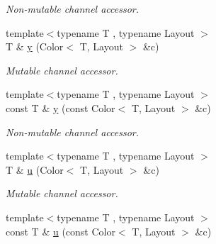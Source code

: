 \begin{DoxyCompactItemize}
\begin{DoxyCompactList}\small\item\em Non-\/mutable channel accessor. \end{DoxyCompactList}\item 
\hypertarget{group___channel_accessors_gac90c52c5b3a7b2a7e3761e6e84f25778}{{\footnotesize template$<$typename T , typename Layout $>$ }\\T \& \hyperlink{group___channel_accessors_gac90c52c5b3a7b2a7e3761e6e84f25778}{y} (Color$<$ T, Layout $>$ \&c)}\label{group___channel_accessors_gac90c52c5b3a7b2a7e3761e6e84f25778}

\begin{DoxyCompactList}\small\item\em Mutable channel accessor. \end{DoxyCompactList}\item 
\hypertarget{group___channel_accessors_ga42846abfe3173fb8a817a0e3a3fa9c44}{{\footnotesize template$<$typename T , typename Layout $>$ }\\const T \& \hyperlink{group___channel_accessors_ga42846abfe3173fb8a817a0e3a3fa9c44}{y} (const Color$<$ T, Layout $>$ \&c)}\label{group___channel_accessors_ga42846abfe3173fb8a817a0e3a3fa9c44}

\begin{DoxyCompactList}\small\item\em Non-\/mutable channel accessor. \end{DoxyCompactList}\item 
\hypertarget{group___channel_accessors_ga056f2dcf2b4d1976e50bf20547617584}{{\footnotesize template$<$typename T , typename Layout $>$ }\\T \& \hyperlink{group___channel_accessors_ga056f2dcf2b4d1976e50bf20547617584}{u} (Color$<$ T, Layout $>$ \&c)}\label{group___channel_accessors_ga056f2dcf2b4d1976e50bf20547617584}

\begin{DoxyCompactList}\small\item\em Mutable channel accessor. \end{DoxyCompactList}\item 
\hypertarget{group___channel_accessors_gae90bfcd1e7783b7306b5d1df688f3671}{{\footnotesize template$<$typename T , typename Layout $>$ }\\const T \& \hyperlink{group___channel_accessors_gae90bfcd1e7783b7306b5d1df688f3671}{u} (const Color$<$ T, Layout $>$ \&c)}\label{group___channel_accessors_gae90bfcd1e7783b7306b5d1df688f3671}


\end{DoxyCompactItemize}
